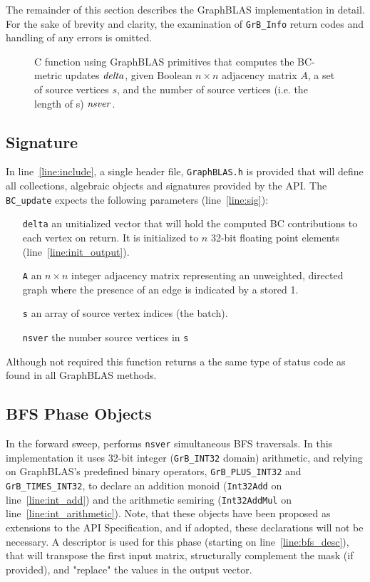 The remainder of this section describes the 
GraphBLAS implementation in detail.  
For the sake of brevity and clarity, the examination of 
{\tt GrB\_Info} return codes and handling of any errors is omitted.


\begin{figure*}[h]
\caption{C function using GraphBLAS primitives that computes the BC-metric
updates ${\it delta}$, given Boolean $n \times n$ adjacency matrix $A$, a
set of source vertices $s$, and the number of source vertices (i.e. the 
length of s) ${\it nsver}$.}
\label{Fig:BClisting}
{\scriptsize

}
\end{figure*}

\subsection{Signature}

In line~\ref{line:include}, a single header file, {\tt GraphBLAS.h} is provided
that will define all collections, algebraic objects and signatures provided by the
API. The {\tt BC\_update} expects the following parameters (line~\ref{line:sig}):

\begin{itemize} [leftmargin=0.6in]
\item[\tt delta] an unitialized vector that will hold the computed BC contributions to each
                 vertex on return.  It is initialized to $n$ 32-bit floating
                 point elements (line~\ref{line:init_output}).
\item[\tt A]     an $n\times n$ integer adjacency matrix representing an
                 unweighted, directed graph where the presence of an edge
                 is indicated by a stored 1.
\item[\tt s]     an array of source vertex indices (the batch).
\item[\tt nsver] the number source vertices in {\tt s}
\end{itemize}

Although not required this function returns a the same type of status code as
found in all GraphBLAS methods.

\subsection{BFS Phase Objects}
 
In the forward sweep, performs {\tt nsver} simultaneous BFS traversals.  In this
implementation it uses 32-bit integer ({\tt GrB\_INT32} domain) arithmetic, and
relying on GraphBLAS's predefined binary operators, {\tt GrB\_PLUS\_INT32} and 
{\tt GrB\_TIMES\_INT32}, to declare an addition monoid ({\tt Int32Add} on line~\ref{line:int_add})
and the arithmetic semiring ({\tt Int32AddMul} on line~\ref{line:int_arithmetic}).
Note, that these objects have been proposed as
extensions to the API Specification, and if adopted, these declarations will not
be necessary.  A descriptor is used for this phase (starting on line~\ref{line:bfs_desc}),
that will transpose the first input matrix, structurally complement the mask (if provided),
and "replace" the values in the output vector.

